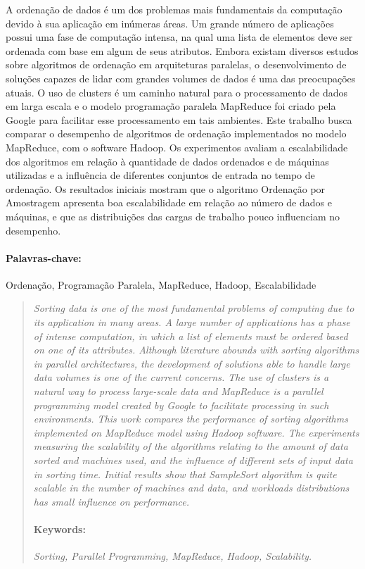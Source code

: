 \begin{resumo}

A ordenação de dados é um dos problemas mais fundamentais da computação devido à sua aplicação em inúmeras áreas. Um grande número de aplicações possui uma fase de computação intensa, na qual uma lista de elementos deve ser ordenada com base em algum de seus atributos. Embora existam diversos estudos sobre algoritmos de ordenação em arquiteturas paralelas, o desenvolvimento de soluções capazes de lidar com grandes volumes de dados é uma das preocupações atuais. O uso de clusters é um caminho natural para o processamento de dados em larga escala e o modelo programação paralela MapReduce foi criado pela Google para facilitar esse processamento em tais ambientes. Este trabalho busca comparar o desempenho de algoritmos de ordenação implementados no modelo MapReduce, com o software Hadoop.  Os experimentos avaliam a escalabilidade dos algoritmos em relação à quantidade de dados ordenados e de máquinas utilizadas e a influência de diferentes conjuntos de entrada no tempo de ordenação. Os resultados iniciais mostram que o algoritmo Ordenação por Amostragem apresenta boa escalabilidade em relação ao número de dados e máquinas, e que as distribuições das cargas de trabalho pouco influenciam no desempenho. 
    
	\paragraph{Palavras-chave:} Ordenação, Programação Paralela, MapReduce, Hadoop, Escalabilidade
\end{resumo}


\begin{abstract}

\textit{Sorting data is one of the most fundamental problems of computing due to its application in many areas. A large number of applications has a phase of intense computation, in which a list of elements must be ordered based on one of its attributes. Although literature abounds with sorting algorithms in parallel architectures, the development of solutions able to handle large data volumes is one of the current concerns. The use of clusters is a natural way to process large-scale data and MapReduce is a parallel programming model created by Google to facilitate processing in such environments. This work compares the performance of sorting algorithms implemented on MapReduce model using Hadoop software. 
The experiments measuring the scalability of the algorithms relating to the amount of data sorted and machines used, and the influence of different sets of input data in sorting time. Initial results show that SampleSort algorithm is quite scalable  in the number of machines and data, and workloads distributions has small influence on performance.}
	
	\paragraph{Keywords:} \textit{Sorting, Parallel Programming, MapReduce, Hadoop, Scalability.}
\end{abstract}
